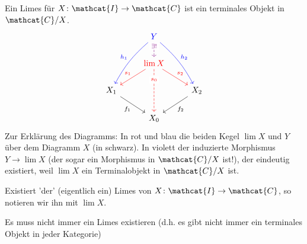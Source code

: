 \begin{definition}[Limes]\label{def:limes}
    Ein Limes für $X \colon  \mathcat{I} \to  \mathcat{C}$ ist ein terminales Objekt in $\mathcat{C} / X$.
    \[
    \begin{tikzcd}
        & {\color{blue}Y}\ar[bend right = 10, blue, swap]{ddl}{h_1} \ar[blue, bend left = 10]{ddr}{h_2} \ar[violet, dashed, "\exists !" description, near start]{d}  \\
        & {\color{red}\lim X} \ar[red,swap]{dl}{s_1} \ar[red]{dr}{s_2} \ar[dashed, "s_0" description, near start, red]{dd}\\
        X_1 \ar[swap]{dr}{f_1} & & X_2\ar{dl}{f_2} \\
         & X_0
    \end{tikzcd}
\]
Zur Erklärung des Diagramms: In rot und blau die beiden Kegel $\lim X$ und  $Y$ über dem Diagramm  $X$ (in schwarz). In violett der induzierte Morphismus  $Y \to  \lim X$ (der sogar ein Morphismus in $\mathcat{C} / X$ ist!), der eindeutig existiert, weil $\lim X$ ein Terminalobjekt in  $\mathcat{C} / X$ ist.
\end{definition}
\begin{dnotation}
    Existiert 'der' (eigentlich ein) Limes von $X \colon  \mathcat{I} \to  \mathcat{C}$, so notieren wir ihn mit $\lim X$.
\end{dnotation}


\begin{warning}
    Es muss nicht immer ein Limes existieren (d.h. es gibt nicht immer ein terminales Objekt in jeder Kategorie)
\end{warning}

